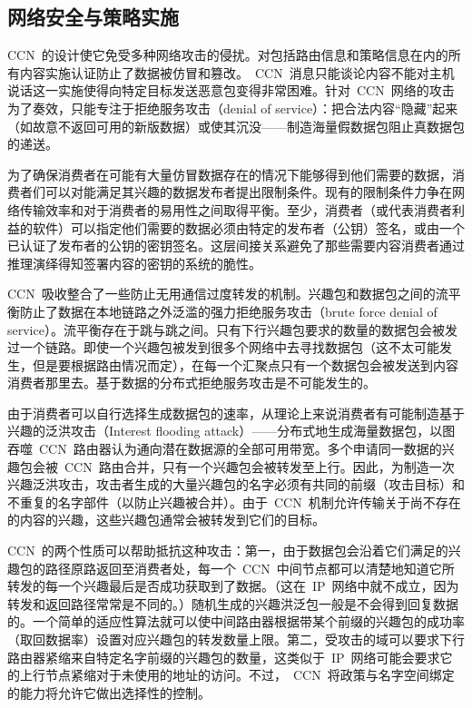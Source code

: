 \subsection{网络安全与策略实施}
\label{sec:5.4}
CCN~的设计使它免受多种网络攻击的侵扰。对包括路由信息和策略信息在内的所有内容实施认证防止了数据被仿冒和篡改。~CCN~消息只能谈论内容不能对主机说话这一实施使得向特定目标发送恶意包变得非常困难。针对~CCN~网络的攻击为了奏效，只能专注于拒绝服务攻击（denial of service）：把合法内容“隐藏”起来（如故意不返回可用的新版数据）或使其沉没——制造海量假数据包阻止真数据包的递送。

为了确保消费者在可能有大量仿冒数据存在的情况下能够得到他们需要的数据，消费者们可以对能满足其兴趣的数据发布者提出限制条件。现有的限制条件力争在网络传输效率和对于消费者的易用性之间取得平衡。至少，消费者（或代表消费者利益的软件）可以指定他们需要的数据必须由特定的发布者（公钥）签名，或由一个已认证了发布者的公钥的密钥签名。这层间接关系避免了那些需要内容消费者通过推理演绎得知签署内容的密钥的系统的脆性。

CCN~吸收整合了一些防止无用通信过度转发的机制。兴趣包和数据包之间的流平衡防止了数据在本地链路之外泛滥的强力拒绝服务攻击（brute force denial of service）。流平衡存在于跳与跳之间。只有下行兴趣包要求的数量的数据包会被发过一个链路。即使一个兴趣包被发到很多个网络中去寻找数据包（这不太可能发生，但是要根据路由情况而定），在每一个汇聚点只有一个数据包会被发送到内容消费者那里去。基于数据的分布式拒绝服务攻击是不可能发生的。

由于消费者可以自行选择生成数据包的速率，从理论上来说消费者有可能制造基于兴趣的泛洪攻击（Interest flooding attack）——分布式地生成海量数据包，以图吞噬~CCN~路由器认为通向潜在数据源的全部可用带宽。多个申请同一数据的兴趣包会被~CCN~路由合并，只有一个兴趣包会被转发至上行。因此，为制造一次兴趣泛洪攻击，攻击者生成的大量兴趣包的名字必须有共同的前缀（攻击目标）和不重复的名字部件（以防止兴趣被合并）。由于~CCN~机制允许传输关于尚不存在的内容的兴趣，这些兴趣包通常会被转发到它们的目标。

CCN~的两个性质可以帮助抵抗这种攻击：第一，由于数据包会沿着它们满足的兴趣包的路径原路返回至消费者处，每一个~CCN~中间节点都可以清楚地知道它所转发的每一个兴趣最后是否成功获取到了数据。（这在~IP~网络中就不成立，因为转发和返回路径常常是不同的。）随机生成的兴趣洪泛包一般是不会得到回复数据的。一个简单的适应性算法就可以使中间路由器根据带某个前缀的兴趣包的成功率（取回数据率）设置对应兴趣包的转发数量上限。第二，受攻击的域可以要求下行路由器紧缩来自特定名字前缀的兴趣包的数量，这类似于~IP~网络可能会要求它的上行节点紧缩对于未使用的地址的访问。不过，~CCN~将政策与名字空间绑定的能力将允许它做出选择性的控制。

